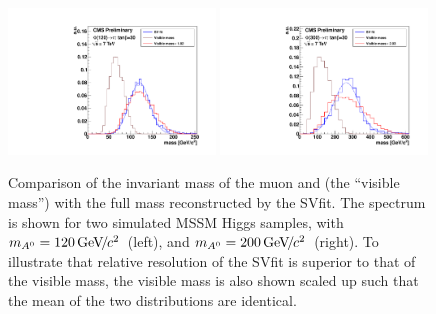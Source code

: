 \begin{figure}[t]
\begin{center}
\includegraphics*[width=0.49\textwidth]{svfit_chapter/figures/sv_fit_approval_plots/sv_vs_vis_A120.pdf}
\includegraphics*[width=0.49\textwidth]{svfit_chapter/figures/sv_fit_approval_plots/sv_vs_vis_A300.pdf}
\caption[Comparison of SVfit with the visible mass observable]{Comparison of the
invariant mass of the muon and \tjet (the ``visible mass'') with the full \TT
mass reconstructed by the SVfit. The spectrum is shown for two simulated MSSM
Higgs samples, with $m_{A^0} = 120{\,\text{Ge\hspace{-.08em}V\hspace{-0.16em}/\hspace{-0.08em}}c^\text{2}}$~(left), and $m_{A^0} = 200{\,\text{Ge\hspace{-.08em}V\hspace{-0.16em}/\hspace{-0.08em}}c^\text{2}}$~(right).  To
illustrate that relative resolution of the SVfit is superior to that of the
visible mass, the visible mass is also shown scaled up such that the mean of the
two distributions are identical.} \label{fig:SVversusVis}
\end{center}
\end{figure} 

\ifx\master\undefined\fi
